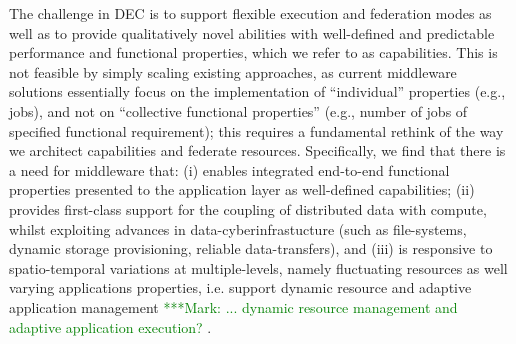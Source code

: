 \documentclass[11pt,final]{article}
\newcommand{\msnote}[1]{ {\textcolor{green} { ***Mark: #1 }}}
\newcommand{\msnote}[1]{}
\begin{document}
{%


 The challenge
in DEC is to support flexible execution and federation modes as well as to
provide qualitatively novel abilities with well-defined and predictable
performance and functional properties, which we refer to as capabilities.  This
is not feasible by simply scaling existing approaches, as current middleware
solutions essentially focus on the implementation of ``individual'' properties
(e.g., jobs), and not on ``collective functional properties'' (e.g., number of
jobs of specified functional requirement); this requires a fundamental rethink
of the way we architect capabilities and federate resources.  Specifically, we
find that there is a need for middleware that: (i) enables integrated 
end-to-end functional properties presented to the application layer as 
well-defined capabilities; (ii) provides first-class support for the coupling 
of distributed data with compute, whilst exploiting advances in 
data-cyberinfrastucture (such as file-systems, dynamic storage provisioning, 
reliable data-transfers), and (iii) is responsive to spatio-temporal 
variations at multiple-levels, namely fluctuating resources as well varying 
applications properties, i.e. support dynamic resource and adaptive 
application management\msnote{... dynamic resource management and adaptive 
application execution?}.



}
\end{document}
